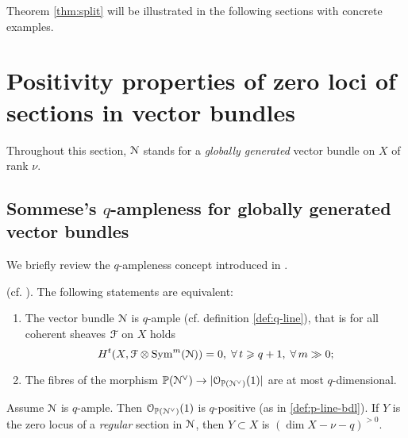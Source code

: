 \documentclass[11pt,reqno]{amsart}
\newenvironment{m-remark}{\vskip5pt\refstepcounter{stff}\trivlist \itemindent 0pt
\item[\hskip\labelsep\bf Remark~\thestff]\ignorespaces}{\endtrivlist\vskip5pt}
\let\euf\EuScript
\let\mbb\mathbb
\numberwithin{equation}{section}
\numberwithin{figure}{section}
\let\ges\geqslant
\begin{document}
Theorem \ref{thm:split} will be illustrated in the following sections 
with concrete examples.  

\section{Positivity properties of zero loci of sections in vector bundles}\label{sct:0vb}

Throughout this section, ${{\euf N}}$ stands for a \emph{globally generated} vector bundle 
on $X$ of rank $\nu$. 

\subsection{Sommese's $q$-ampleness for globally generated vector bundles}
\label{ssct:q-vb}

We briefly review the $q$-ampleness concept introduced in \cite{so}. 

\begin{m-proposition}{\rm (cf. \cite[Proposition 1.7]{so}).}\label{prop:q2}
The following statements are equivalent: 
\begin{enumerate}
\item The vector bundle ${{\euf N}}$ is $q$-ample (cf. definition \ref{def:q-line}), 
that is for all coherent sheaves ${{\euf F}}$ on $X$ holds 
\begin{equation}\label{eq:q21}
H^t(X,{{\euf F}}\otimes{\mathop{\rm Sym}\nolimits}^m({{\euf N}}))=0,\;\forall\,t\ges q+1,\;\forall\,m\gg0;
\end{equation}
\item The fibres of the morphism $\mbb P({{\euf N}}^\vee)\to |{{\euf O}}_{\mbb P({{\euf N}}^\vee)}(1)|$ 
are at most $q$-dimensional. 
\end{enumerate}
\end{m-proposition}

\begin{m-proposition} 
\label{prop:q21} 
Assume ${{\euf N}}$ is $q$-ample. 
Then ${{\euf O}}_{\mbb P({{\euf N}}^\vee)}(1)$ is $q$-positive (as in \ref{def:p-line-bdl}).  
If $Y$ is the zero locus of a \emph{regular} section in ${{\euf N}}$,  
then $Y\subset X$ is $(\dim X-\nu-q)^{{>0}}$. 
\end{m-proposition}
\end{document}
